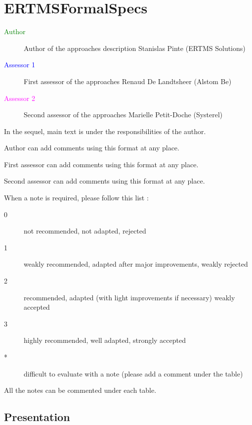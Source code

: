 \chapter{ERTMSFormalSpecs}

\begin{description}
\item[\textcolor{green}{Author}] Author of the approaches description Stanislas Pinte (ERTMS Solutions)
\item[\textcolor{blue}{Assessor 1}] First assessor of the approaches Renaud De Landtsheer (Alstom Be)
\item[\textcolor{magenta}{Assessor 2}] Second assessor of the approaches Marielle Petit-Doche (Systerel)
\end{description}

In the sequel, main text is under the responsibilities of the author.

\begin{author_comment}
Author can add comments using this format at any place.
\end{author_comment}

\begin{assessor1}
First assessor can add comments using this format at any place.
\end{assessor1}

\begin{assessor2}
Second assessor can add comments using this format at any place.
\end{assessor2}

When a note is required, please follow this list :
\begin{description}
\item[0] not recommended, not adapted, rejected
\item[1] weakly recommended, adapted after major improvements, weakly rejected
\item[2] recommended, adapted (with light improvements if necessary) weakly accepted
\item[3] highly recommended, well adapted, strongly accepted
\item[*] difficult to evaluate with a note (please add a comment under the table)
\end{description}

All the notes can be commented under each table.

\section{Presentation}

